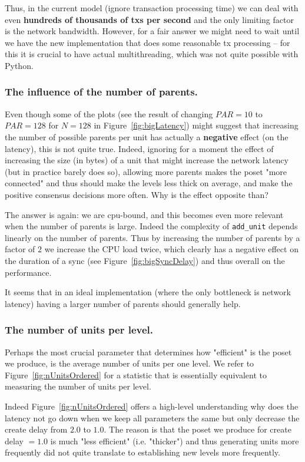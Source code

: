 \documentclass[a4paper,10pt]{article}
\begin{document}
				Thus, in the current model (ignore transaction processing time) we can deal with even {\bf hundreds of thousands of txs per second} and the only limiting factor is the network bandwidth.
				However, for a fair answer we might need to wait until we have the new implementation that does some reasonable tx processing -- for this it is crucial to have actual multithreading, which was not quite possible with Python.

			\subsubsection*{The influence of the number of parents.}
				Even though some of the plots (see the result of changing $PAR=10$ to $PAR=128$ for $N=128$ in Figure~\ref{fig:bigLatency}) might suggest that increasing the number of possible parents per unit has actually a {\bf negative} effect (on the latency), this is not quite true.
				Indeed, ignoring for a moment the effect of increasing the size (in bytes) of a unit that might increase the network latency (but in practice barely does so), allowing more parents makes the poset "more connected" and thus should make the levels less thick on average, and make the positive consensus decisions more often. Why is the effect opposite than?

				The answer is again: we are cpu-bound, and this becomes even more relevant when the number of parents is large. Indeed the complexity of \lstinline{add_unit} depends linearly on the number of parents. Thus by increasing the number of parents by a factor of $2$ we increase the CPU load twice, which clearly has a negative effect on the duration of a sync (see Figure~\ref{fig:bigSyncDelay}) and thus overall on the performance.

				It seems that in an ideal implementation (where the only bottleneck is network latency) having a larger number of parents should generally help.

			\subsubsection*{The number of units per level.}
				Perhaps the most crucial parameter that determines how "efficient" is the poset we produce, is the average number of units per one level.
				We refer to Figure~\ref{fig:nUnitsOrdered} for a statistic that is essentially equivalent to measuring the number of units per level.

				Indeed Figure~\ref{fig:nUnitsOrdered} offers a high-level understanding why does the latency not go down when we keep all parameters the same but only decrease the create delay from $2.0$ to $1.0$.
				The reason is that the poset we produce for create delay $=1.0$ is much "less efficient" (i.e. "thicker") and thus generating units more frequently did not quite translate to establishing new levels more frequently.
\end{document}
